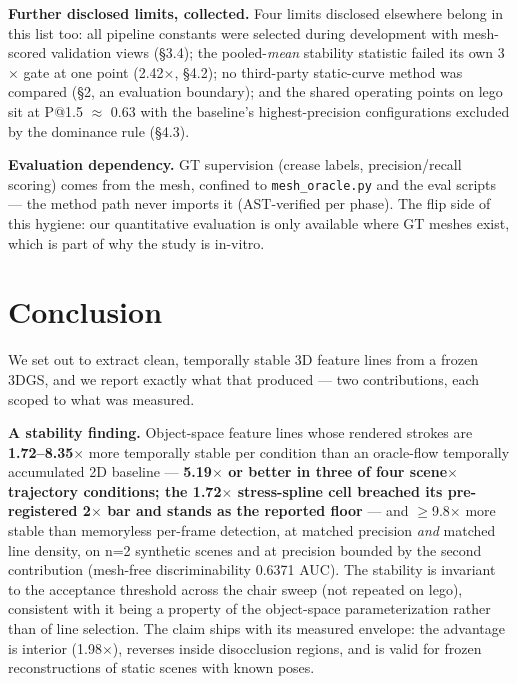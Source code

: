 \textbf{Further disclosed limits, collected.} Four limits disclosed elsewhere belong in this
list too: all pipeline constants were selected during development with mesh-scored
validation views (\S3.4); the pooled-\emph{mean} stability statistic failed its own 3$\times$ gate at
one point (2.42$\times$, \S4.2); no third-party static-curve method was compared (\S2, an
evaluation boundary); and the shared operating points on lego sit at P@1.5 $\approx$ 0.63 with the
baseline's highest-precision configurations excluded by the dominance rule (\S4.3).

\textbf{Evaluation dependency.} GT supervision (crease labels, precision/recall scoring) comes
from the mesh, confined to \texttt{mesh\_oracle.py} and the eval scripts --- the method path never
imports it (AST-verified per phase). The flip side of this hygiene: our quantitative
evaluation is only available where GT meshes exist, which is part of why the study is
in-vitro.

\section{Conclusion}
We set out to extract clean, temporally stable 3D feature lines from a frozen 3DGS, and we
report exactly what that produced --- two contributions, each scoped to what was measured.

\textbf{A stability finding.} Object-space feature lines whose rendered strokes are
\textbf{1.72--8.35$\times$} more temporally stable per condition than an oracle-flow temporally
accumulated 2D baseline --- \textbf{5.19$\times$ or better in three of four scene$\times$trajectory conditions;
the 1.72$\times$ stress-spline cell breached its pre-registered 2$\times$ bar and stands as the reported
floor} --- and $\geq$9.8$\times$ more stable than memoryless per-frame detection, at matched precision
\emph{and} matched line density, on n=2 synthetic scenes and at precision bounded by the second
contribution (mesh-free discriminability 0.6371 AUC). The stability is invariant to the
acceptance threshold across the chair sweep (not repeated on lego),
consistent with it being a property of the object-space parameterization rather than of
line selection. The claim ships with its measured envelope: the advantage is interior
(1.98$\times$), reverses inside disocclusion regions, and is valid for frozen reconstructions of
static scenes with known poses.

